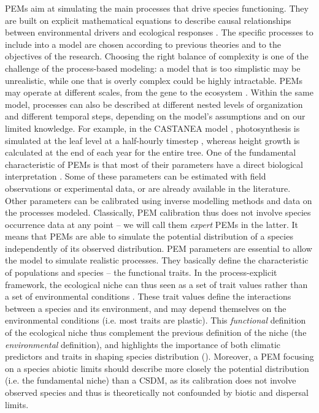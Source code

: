 \noindent PEMs aim at simulating the main processes that drive species functioning. They are built on explicit mathematical equations to describe causal relationships between environmental drivers and ecological responses \citep{Dormann2012}. The specific processes to include into a model are chosen according to previous theories and to the objectives of the research.
Choosing the right balance of complexity is one of the challenge of the process-based modeling: a model that is too simplistic may be unrealistic, while one that is overly complex could be highly intractable. PEMs may operate at different scales, from the gene to the ecosystem \citep{Pilowsky2022}. Within the same model, processes can also be described at different nested levels of organization and different temporal steps, depending on the model's assumptions and on our limited knowledge. For example, in the CASTANEA model \citep{Dufrene2005}, photosynthesis is simulated at the leaf level at a half-hourly timestep \citep{Farquhar1980}, whereas height growth is calculated at the end of each year for the entire tree. One of the fundamental characteristic of PEMs is that most of their parameters have a direct biological interpretation \citep{Dormann2012}. Some of these parameters can be estimated with field observations or experimental data, or are already available in the literature.  Other parameters can be calibrated using inverse modelling methods and data on the processes modeled. Classically, PEM calibration thus does not involve species occurrence data at any point -- we will call them \emph{expert} PEMs in the latter. It means that PEMs are able to simulate the potential distribution of a species independently of its observed distribution. PEM parameters are essential to allow the model to simulate realistic processes. They basically define the characteristic of populations and species -- the functional traits. In the process-explicit framework, the ecological niche can thus seen as a set of trait values rather than a set of environmental conditions \citep{Rosenzweig1987, Kearney2010}. These trait values define the interactions between a species and its environment, and may depend themselves on the environmental conditions (i.e. most traits are plastic). This \emph{functional} definition of the ecological niche thus complement the previous definition of the niche (the \emph{environmental} definition), and highlights the importance of both climatic predictors and traits in shaping species distribution (). Moreover, a PEM focusing on a species abiotic limits should describe more closely the potential distribution (i.e. the fundamental niche) than a CSDM, as its calibration does not involve observed species and thus is theoretically not confounded by biotic and dispersal limits.

